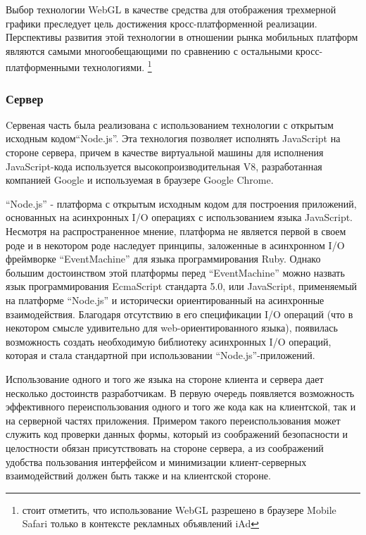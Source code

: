 Выбор технологии WebGL в качестве средства для отображения трехмерной графики
преследует цель достижения кросс-платформенной реализации. Перспективы развития
этой технологии в отношении рынка мобильных платформ являются самыми
многообещающими по сравнению с остальными кросс-платформенными технологиями.
\footnote{стоит отметить, что использование WebGL разрешено в браузере Mobile
Safari только в контексте рекламных объявлений iAd}

\subsubsection{Сервер}

Cервеная часть была реализована с использованием технологии с открытым исходным
кодом``Node.js''. Эта технология позволяет исполнять JavaScript на стороне
сервера, причем в качестве виртуальной машины для исполнения JavaScript-кода
используется высокопроизводительная V8, разработанная компанией Google и
используемая в браузере Google Chrome.

``Node.js''\cite{nodejs} - платформа с открытым исходным кодом для построения приложений,
основанных на асинхронных I/O операциях с использованием языка JavaScript.
Несмотря на распространенное мнение, платформа не является первой в своем роде и
в некотором роде наследует принципы, заложенные в асинхронном I/O фреймворке
``EventMachine'' для языка программирования Ruby. Однако большим достоинством
этой платформы перед ``EventMachine'' можно назвать язык программирования
EcmaScript стандарта 5.0, или JavaScript, применяемый на платформе ``Node.js'' и
исторически ориентированный на асинхронные взаимодействия.  Благодаря отсутствию
в его спецификации I/O операций (что в некотором смысле удивительно для
web-ориентированного языка), появилась возможность создать необходимую
библиотеку асинхронных I/O операций, которая и стала стандартной при
использовании ``Node.js''-приложений.

Использование одного и того же языка на стороне клиента и сервера дает несколько
достоинств разработчикам. В первую очередь появляется возможность эффективного
переиспользования одного и того же кода как на клиентской, так и на серверной
частях приложения. Примером такого переиспользования может служить
код проверки данных формы, который из соображений безопасности и целостности
обязан присутствовать на стороне сервера, а из соображений удобства пользования
интерфейсом и минимизации клиент-серверных взаимодействий должен быть также и на
клиентской стороне.

